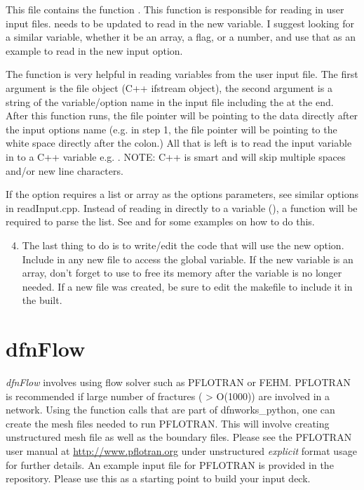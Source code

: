 \documentclass[letterpaper,10pt,english]{sphinxmanual}
\begin{document}
This file contains the function .  This function is responsible
for reading in user input files.   needs to be updated to read in
the new variable. I suggest looking for a similar variable, whether it be an
array, a flag, or a number, and use that as an example to read in the new input
option.

The function  is very helpful in reading variables from the user
input file. The first argument is the file object (C++ ifstream object), the
second argument is a string of the variable/option name in the input file
including the \code{:} at the end.  After this function runs, the file pointer will
be pointing to the data directly after the input options name (e.g. in step 1,
the file pointer will be pointing to the white space directly after the colon.)
All that is left is to read the input variable in to a C++ variable e.g. . NOTE: C++ is smart and will skip multiple spaces and/or new line
characters.

If the option requires a list or array as the options parameters, see similar
options in readInput.cpp. Instead of reading in directly to a variable (), a function will be required to parse the list. See
 and  for some examples on how
to do this.
\begin{enumerate}
\setcounter{enumi}{3}
\item {} 
The last thing to do is to write/edit the code that will use the new option.
Include  in any new file to access the global variable. If the
new variable is an array, don’t forget to use  to free its
memory after the variable is no longer needed. If a new file was created, be
sure to edit the makefile to include it in the built.

\end{enumerate}


\chapter{dfnFlow}
\label{dfnflow:dfnflow}\label{dfnflow::doc}\label{dfnflow:dfnflow-chapter}
\emph{dfnFlow} involves using flow solver such as PFLOTRAN or FEHM. PFLOTRAN is recommended if large number of fractures ( \textgreater{} O(1000)) are involved in a network. Using the function calls that are part of dfnworks\_python, one can create the mesh files needed to run PFLOTRAN. This will involve creating unstructured mesh file  as well as the boundary   files. Please see the PFLOTRAN user manual at \href{http://www.pflotran.org}{http://www.pflotran.org} under unstructured \emph{explicit} format usage for further details. An example input file for PFLOTRAN is provided in the repository. Please use this as a starting point to build your input deck.
\end{document}
